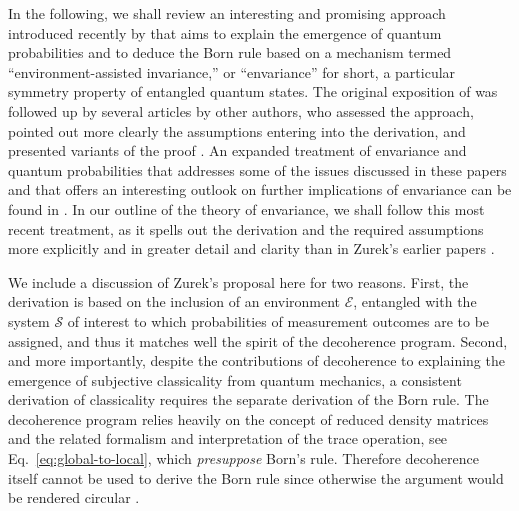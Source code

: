 \documentclass[rmp,aps,amsmath,amsfonts,noshowkeys,noshowpacs,12pt]{revtex4}
\newcommand{\cf}{cf.\ }
\begin{document}
In the following, we shall review an interesting and promising
approach introduced recently by
\citet{Zurek:2002:ii,Zurek:2003:rv,Zurek:2003:pl,Zurek:2004:yb} that
aims to explain the emergence of quantum probabilities and to deduce
the Born rule based on a mechanism termed ``environment-assisted
invariance,'' or ``envariance'' for short, a particular symmetry
property of entangled quantum states. The original exposition of
\citet{Zurek:2002:ii} was followed up by several articles by other
authors, who assessed the approach, pointed out more clearly the
assumptions entering into the derivation, and presented variants of
the proof \cite{Schlosshauer:2003:ms,Barnum:2003:yb,Mohrhoff:2004:tv}.
An expanded treatment of envariance and quantum probabilities that
addresses some of the issues discussed in these papers and that offers
an interesting outlook on further implications of envariance can be
found in \citet{Zurek:2004:yb}. In our outline of the theory of
envariance, we shall follow this most recent treatment, as it spells
out the derivation and the required assumptions more explicitly and
in greater detail and clarity than in Zurek's earlier
\citeyearpar{Zurek:2002:ii,Zurek:2003:rv,Zurek:2003:pl} papers
\citep[\cf also the remarks of][]{Schlosshauer:2003:ms}.

We include a discussion of Zurek's proposal here for two reasons.
First, the derivation is based on the inclusion of an environment
$\mathcal{E}$, entangled with the system $\mathcal{S}$ of interest to
which probabilities of measurement outcomes are to be assigned, and
thus it matches well the spirit of the decoherence program. Second,
and more importantly, despite the contributions of decoherence to
explaining the emergence of subjective classicality from quantum
mechanics, a consistent derivation of classicality \citep[including a
motivation for some of the axioms of quantum mechanics, as suggested
by][]{Zurek:2002:ii} requires the separate derivation of the Born
rule.  The decoherence program relies heavily on the concept of
reduced density matrices and the related formalism and interpretation
of the trace operation, see Eq.~\eqref{eq:global-to-local}, which
\emph{presuppose} Born's rule.  Therefore decoherence itself cannot be
used to derive the Born rule \citetext{as was tried, for example, by
  \citealp{Deutsch:1999:tz} and \citealp{Zurek:1998:re}} since otherwise
the argument would be rendered circular
\citep{Zeh:1996:gy,Zurek:2002:ii}.
 
\end{document}
